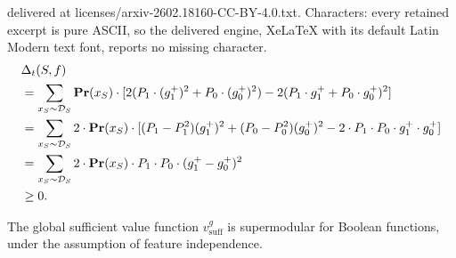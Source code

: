 \documentclass[10pt,a4paper]{amsart}
\newcommand{\fml}[1]{{\mathcal{#1}}}
\newcommand{\mbf}[1]{\ensuremath\mathbf{#1}}
\newcommand{\x}{\textbf{x}}
\begin{document}
delivered at licenses/arxiv-2602.18160-CC-BY-4.0.txt. Characters: every retained excerpt is pure ASCII, so the delivered engine, XeLaTeX with its default Latin Modern text font, reports no missing character.
\begin{equation} \label{eq:gbx03}
\begin{aligned}
&\Delta_{t}(S,f) \\
&= \sum_{\x_{S} \sim \fml{D}_{S}} \mbf{Pr}(\x_{S} ) \cdot [2(P_{1} \cdot (g_{1}^{+})^2 + P_{0} \cdot (g_{0}^{+})^2) - 2(P_{1} \cdot g_{1}^{+} + P_{0} \cdot g_{0}^{+})^2] \\
&= \sum_{\x_{S} \sim \fml{D}_{S}} 2 \cdot \mbf{Pr}(\x_{S}) \cdot [(P_{1} - P_{1}^2) (g_{1}^{+})^2 + (P_{0} - P_{0}^2) (g_{0}^{+})^2 - 2 \cdot P_{1} \cdot P_{0} \cdot g_{1}^{+} \cdot g_{0}^{+}] \\
&= \sum_{\x_{S} \sim \fml{D}_{S}} 2 \cdot \mbf{Pr}(\x_{S}) \cdot P_{1} \cdot P_{0} \cdot (g_{1}^{+} - g_{0}^{+})^2 \\
&\ge 0.
\end{aligned}
\end{equation}

\begin{lemma} \label{lem:bfid}
The global sufficient value function $v^g_{\text{suff}}$
is supermodular for Boolean functions, under the assumption of feature independence.
\end{lemma}
\end{document}
